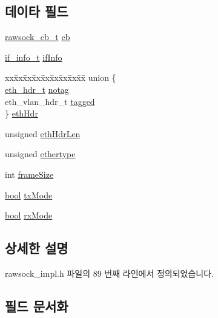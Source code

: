 \subsection*{데이타 필드}
\begin{DoxyCompactItemize}
\item 
\hyperlink{structrawsock__cb__t}{rawsock\+\_\+cb\+\_\+t} \hyperlink{structbase__rawsock_a2b12273a224877b0bbbe5e7f774c7568}{cb}
\item 
\hyperlink{structif__info__t}{if\+\_\+info\+\_\+t} \hyperlink{structbase__rawsock_a854c8024bff83a6b215a4897ac1d8944}{if\+Info}
\item 
\begin{tabbing}
xx\=xx\=xx\=xx\=xx\=xx\=xx\=xx\=xx\=\kill
union \{\\
\>\hyperlink{mrpd_8h_adb02009b0d416a4c7ba2f427dbf0e5cb}{eth\_hdr\_t} \hyperlink{structbase__rawsock_a53fa4eb792bc48ddf828aa079f555c15}{notag}\\
\>eth\_vlan\_hdr\_t \hyperlink{structbase__rawsock_ab46e7821537b027ee4346ea3c812f07d}{tagged}\\
\} \hyperlink{structbase__rawsock_a96ca5b853db73607106ccfb108196547}{ethHdr}\\

\end{tabbing}\item 
unsigned \hyperlink{structbase__rawsock_aa718a737f571d39dde84a733a7dc08b3}{eth\+Hdr\+Len}
\item 
unsigned \hyperlink{structbase__rawsock_a71d9329c840aa95ce42cc15d25219bfb}{ethertype}
\item 
int \hyperlink{structbase__rawsock_aa3dad37bb3b3c95138a96b2668936923}{frame\+Size}
\item 
\hyperlink{avb__gptp_8h_af6a258d8f3ee5206d682d799316314b1}{bool} \hyperlink{structbase__rawsock_a15ac92f42c8328bb63a903014e00dda0}{tx\+Mode}
\item 
\hyperlink{avb__gptp_8h_af6a258d8f3ee5206d682d799316314b1}{bool} \hyperlink{structbase__rawsock_aad4d1429d48996f23f9dd4b0f1940850}{rx\+Mode}
\end{DoxyCompactItemize}


\subsection{상세한 설명}


rawsock\+\_\+impl.\+h 파일의 89 번째 라인에서 정의되었습니다.



\subsection{필드 문서화}
